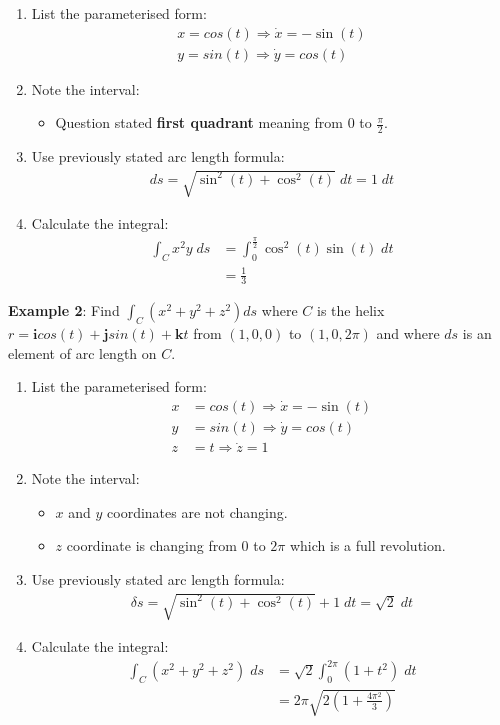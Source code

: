 \documentclass[10pt,a4paper]{article}
\begin{document}
\begin{enumerate}
    \item List the parameterised form:
    \begin{align*}
        x = cos(t) \Rightarrow \dot{x} = -\sin(t) \\
        y = sin(t) \Rightarrow \dot{y} = cos(t)
    \end{align*}
    \item Note the interval: 
    \begin{itemize}
        \item Question stated \textbf{first quadrant} meaning from $0$ to $\frac{\pi}{2}$.
    \end{itemize}
    \item Use previously stated arc length formula:
    \begin{align*}
        ds = \sqrt{\sin^2(t)+\cos^2(t)}\; dt = 1 \; dt 
    \end{align*}
    \item Calculate the integral:
    \begin{align*}
        \int_C x^2y \; ds &= \int_0^{\frac{\pi}{2}}\cos^2(t)\sin(t) \; dt \\
        &= \frac{1}{3}
    \end{align*}
\end{enumerate}

\textbf{Example 2}: Find $\int_C(x^2+y^2+z^2)ds$ where $C$ is the helix $r= \textbf{i} cos(t)+
\textbf{j}sin(t)+\textbf{k}t$ from $(1,0,0)$ to $(1,0,2\pi)$ and where $ds$ is an element of arc
length on $C$.
\begin{enumerate}
    \item List the parameterised form:
    \begin{align*}
        x &= cos(t) \Rightarrow \dot{x} = -\sin(t) \\
        y &= sin(t) \Rightarrow \dot{y} = cos(t) \\
        z &= t \Rightarrow \dot{z} = 1
    \end{align*}
    \item Note the interval: 
    \begin{itemize}
        \item $x$ and $y$ coordinates are not changing.
        \item $z$ coordinate is changing from $0$ to $2\pi$ which is a full revolution.
    \end{itemize}
    \item Use previously stated arc length formula:
    \begin{align*}
        \delta s = \sqrt{\sin^2(t)+\cos^2(t)} + 1 \; dt = \sqrt{2}\; dt
    \end{align*}
    \item Calculate the integral:
    \begin{align*}
        \int_C (x^2 + y^2 + z^2) \; ds &= \sqrt{2} \int_0^{2\pi} (1+t^2)\; dt \\
        &= 2\pi \sqrt{2 \left(1+\frac{4\pi^2}{3}\right)}
    \end{align*}
\end{enumerate}
\end{document}
